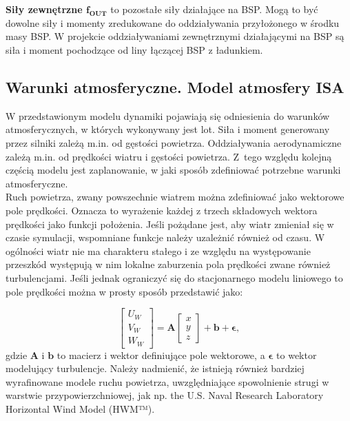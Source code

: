 \textbf{Siły zewnętrzne $\bm{f_{OUT}}$} to pozostałe siły działające na BSP. Mogą to być dowolne siły i momenty zredukowane do oddziaływania przyłożonego w środku masy BSP. W projekcie oddziaływaniami zewnętrznymi działającymi na BSP są siła i moment pochodzące od liny łączącej BSP z ładunkiem.

\subsection{Warunki atmosferyczne. Model atmosfery ISA}

W przedstawionym modelu dynamiki pojawiają się odniesienia do warunków atmosferycznych, w których wykonywany jest lot. Siła i moment generowany przez silniki zależą m.in. od gęstości powietrza. Oddziaływania aerodynamiczne zależą m.in. od prędkości wiatru i gęstości powietrza. Z~tego względu kolejną częścią modelu jest zaplanowanie, w jaki sposób zdefiniować potrzebne warunki atmosferyczne.\\

Ruch powietrza, zwany powszechnie wiatrem można zdefiniować jako wektorowe pole prędkości. Oznacza to wyrażenie każdej z trzech składowych wektora prędkości jako funkcji położenia. Jeśli pożądane jest, aby wiatr zmieniał się w czasie symulacji, wspomniane funkcje należy uzależnić również od czasu. W ogólności wiatr nie ma charakteru stałego i ze względu na występowanie przeszkód występują w nim lokalne zaburzenia pola prędkości zwane również turbulencjami. Jeśli jednak ograniczyć się do stacjonarnego modelu liniowego to pole prędkości można w prosty sposób przedstawić jako:

\[
	\begin{bmatrix} U_W \\ V_W \\ W_W\end{bmatrix} = \bm{A} \begin{bmatrix} x \\ y \\ z\end{bmatrix}  + \bm{b} + \bm{\epsilon},
\]
gdzie $\bm{A}$ i $\bm{b}$ to macierz i wektor definiujące pole wektorowe, a $\bm{\epsilon}$ to wektor modelujący turbulencje. Należy nadmienić, że istnieją również bardziej wyrafinowane modele ruchu powietrza, uwzględniające spowolnienie strugi w warstwie przypowierzchniowej, jak np. the U.S. Naval Research Laboratory Horizontal Wind Model (HWM™).

